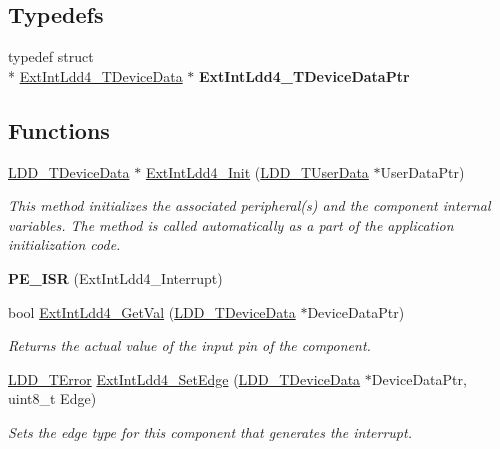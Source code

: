 \subsection*{Typedefs}
\begin{DoxyCompactItemize}
\item 
\hypertarget{group___ext_int_ldd4__module_gafcc80541a6b65be0fd873487ec812a56}{typedef struct \\*
\hyperlink{struct_ext_int_ldd4___t_device_data}{Ext\-Int\-Ldd4\-\_\-\-T\-Device\-Data} $\ast$ {\bfseries Ext\-Int\-Ldd4\-\_\-\-T\-Device\-Data\-Ptr}}\label{group___ext_int_ldd4__module_gafcc80541a6b65be0fd873487ec812a56}

\end{DoxyCompactItemize}
\subsection*{Functions}
\begin{DoxyCompactItemize}
\item 
\hyperlink{group___p_e___types__module_gac5cf1362f1f0e3a2ce71b1bf2276d091}{L\-D\-D\-\_\-\-T\-Device\-Data} $\ast$ \hyperlink{group___ext_int_ldd4__module_ga957ff91899de7c76cb5df13177134960}{Ext\-Int\-Ldd4\-\_\-\-Init} (\hyperlink{group___p_e___types__module_ga0b66a73f87238a782318aa0be7578e35}{L\-D\-D\-\_\-\-T\-User\-Data} $\ast$User\-Data\-Ptr)
\begin{DoxyCompactList}\small\item\em This method initializes the associated peripheral(s) and the component internal variables. The method is called automatically as a part of the application initialization code. \end{DoxyCompactList}\item 
\hypertarget{group___ext_int_ldd4__module_ga95399b81989a099bb7a1c4e0ed77480f}{{\bfseries P\-E\-\_\-\-I\-S\-R} (Ext\-Int\-Ldd4\-\_\-\-Interrupt)}\label{group___ext_int_ldd4__module_ga95399b81989a099bb7a1c4e0ed77480f}

\item 
bool \hyperlink{group___ext_int_ldd4__module_ga6ec76062456005ea035001124d441a19}{Ext\-Int\-Ldd4\-\_\-\-Get\-Val} (\hyperlink{group___p_e___types__module_gac5cf1362f1f0e3a2ce71b1bf2276d091}{L\-D\-D\-\_\-\-T\-Device\-Data} $\ast$Device\-Data\-Ptr)
\begin{DoxyCompactList}\small\item\em Returns the actual value of the input pin of the component. \end{DoxyCompactList}\item 
\hyperlink{group___p_e___types__module_ga24c2b045fd04e79e85f261ce4df35588}{L\-D\-D\-\_\-\-T\-Error} \hyperlink{group___ext_int_ldd4__module_ga5e5afc23d4575c4a062dd514f5f8e846}{Ext\-Int\-Ldd4\-\_\-\-Set\-Edge} (\hyperlink{group___p_e___types__module_gac5cf1362f1f0e3a2ce71b1bf2276d091}{L\-D\-D\-\_\-\-T\-Device\-Data} $\ast$Device\-Data\-Ptr, uint8\-\_\-t Edge)
\begin{DoxyCompactList}\small\item\em Sets the edge type for this component that generates the interrupt. \end{DoxyCompactList}\end{DoxyCompactItemize}


